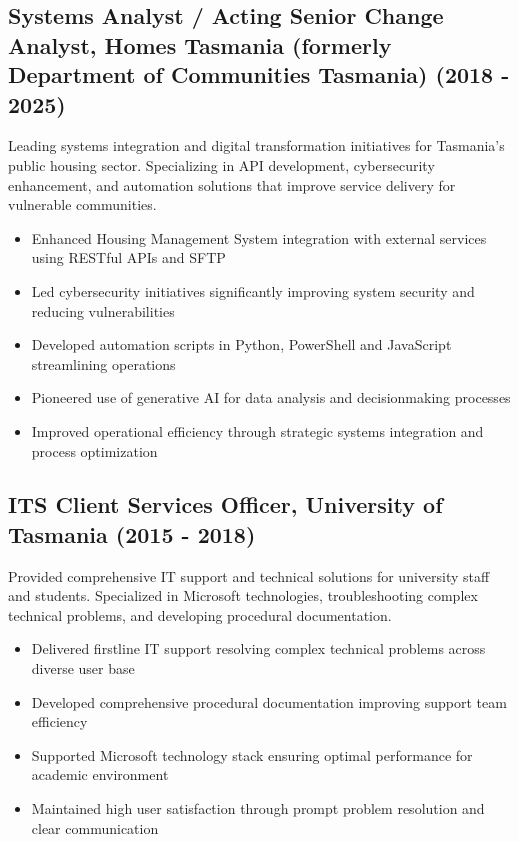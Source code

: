 \documentclass{article}
\begin{document}
\subsection*{Systems Analyst / Acting Senior Change Analyst, Homes Tasmania (formerly Department of Communities Tasmania) (2018 - 2025)}
Leading systems integration and digital transformation initiatives for Tasmania's public housing sector. Specializing in API development, cybersecurity enhancement, and automation solutions that improve service delivery for vulnerable communities.
\begin{itemize}
    \item Enhanced Housing Management System integration with external services using RESTful APIs and SFTP
    \item Led cybersecurity initiatives significantly improving system security and reducing vulnerabilities
    \item Developed automation scripts in Python, PowerShell and JavaScript streamlining operations
    \item Pioneered use of generative AI for data analysis and decisionmaking processes
    \item Improved operational efficiency through strategic systems integration and process optimization
\end{itemize}

\subsection*{ITS Client Services Officer, University of Tasmania (2015 - 2018)}
Provided comprehensive IT support and technical solutions for university staff and students. Specialized in Microsoft technologies, troubleshooting complex technical problems, and developing procedural documentation.
\begin{itemize}
    \item Delivered firstline IT support resolving complex technical problems across diverse user base
    \item Developed comprehensive procedural documentation improving support team efficiency
    \item Supported Microsoft technology stack ensuring optimal performance for academic environment
    \item Maintained high user satisfaction through prompt problem resolution and clear communication
\end{itemize}
\end{document}

